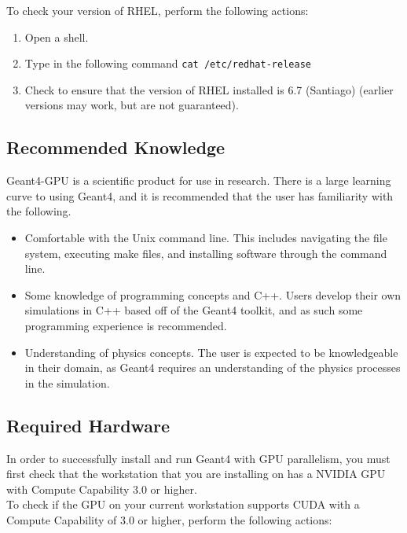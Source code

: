 \documentclass[12pt]{article}
\begin{document}
To check your version of RHEL, perform the following actions:
\begin{enumerate}
\item Open a shell.
\item Type in the following command \texttt{cat /etc/redhat-release}
\item Check to ensure that the version of RHEL installed is 6.7 (Santiago) (earlier versions may work, but are not guaranteed).
\end{enumerate}

\subsection{Recommended Knowledge} %
Geant4-GPU is a scientific product for use in research. There is a large learning curve to using Geant4, and it is recommended that the user has familiarity with the following.
\begin{itemize}
\item Comfortable with the Unix command line. This includes navigating the file system, executing make files, and installing software through the command line.
\item Some knowledge of programming concepts and C++. Users develop their own simulations in C++ based off of the Geant4 toolkit, and as such some programming experience is recommended.
\item Understanding of physics concepts. The user is expected to be knowledgeable in their domain, as Geant4 requires an understanding of the physics processes in the simulation.
\end{itemize}

\subsection{Required Hardware} \label{SecCardReqs}%
In order to successfully install and run Geant4 with GPU parallelism, you must first check that the workstation that you are installing on has a NVIDIA GPU with Compute Capability 3.0 or higher.\\

To check if the GPU on your current workstation supports CUDA with a Compute Capability of 3.0 or higher, perform the following actions:\\
\end{document}
